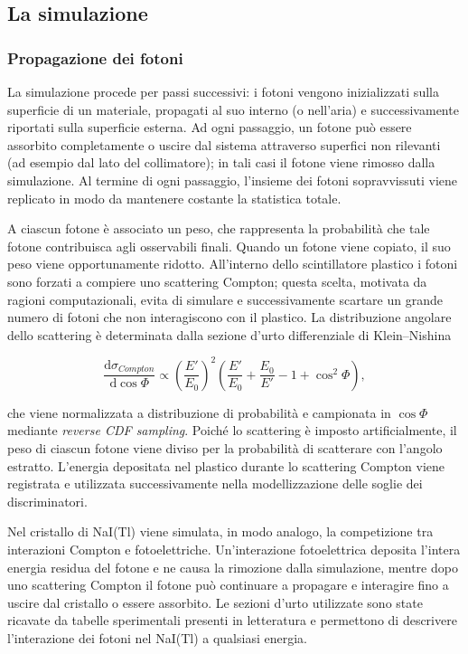 \documentclass[10pt,twocolumn]{article}
\begin{document}
\subsection{La simulazione}

\subsubsection{Propagazione dei fotoni}

La simulazione procede per passi successivi: i fotoni vengono inizializzati sulla superficie di un materiale, propagati al suo interno (o nell’aria) e successivamente riportati sulla superficie esterna. Ad ogni passaggio, un fotone può essere assorbito completamente o uscire dal sistema attraverso superfici non rilevanti (ad esempio dal lato del collimatore); in tali casi il fotone viene rimosso dalla simulazione. Al termine di ogni passaggio, l’insieme dei fotoni sopravvissuti viene replicato in modo da mantenere costante la statistica totale.

A ciascun fotone è associato un peso, che rappresenta la probabilità che tale fotone contribuisca agli osservabili finali. Quando un fotone viene copiato, il suo peso viene opportunamente ridotto. All’interno dello scintillatore plastico i fotoni sono forzati a compiere uno scattering Compton; questa scelta, motivata da ragioni computazionali, evita di simulare e successivamente scartare un grande numero di fotoni che non interagiscono con il plastico. La distribuzione angolare dello scattering è determinata dalla sezione d’urto differenziale di Klein--Nishina

\begin{equation}
\frac{\mathrm{d}\sigma_{Compton}}{\mathrm{d}\cos\Phi} \propto 
\left(\frac{E'}{E_0}\right)^2 
\left(\frac{E'}{E_0} + \frac{E_0}{E'} - 1 + \cos^2\Phi\right),
\label{eq:KN}
\end{equation}

che viene normalizzata a distribuzione di probabilità e campionata in $\cos\Phi$ mediante \textit{reverse CDF sampling}. Poiché lo scattering è imposto artificialmente, il peso di ciascun fotone viene diviso per la probabilità di scatterare con l’angolo estratto. L’energia depositata nel plastico durante lo scattering Compton viene registrata e utilizzata successivamente nella modellizzazione delle soglie dei discriminatori.

Nel cristallo di NaI(Tl) viene simulata, in modo analogo, la competizione tra interazioni Compton e fotoelettriche. Un’interazione fotoelettrica deposita l’intera energia residua del fotone e ne causa la rimozione dalla simulazione, mentre dopo uno scattering Compton il fotone può continuare a propagare e interagire fino a uscire dal cristallo o essere assorbito. Le sezioni d’urto utilizzate sono state ricavate da tabelle sperimentali presenti in letteratura e permettono di descrivere l’interazione dei fotoni nel NaI(Tl) a qualsiasi energia.
\end{document}
